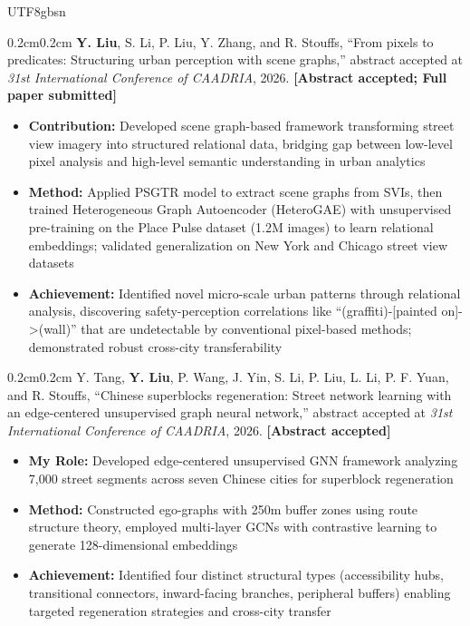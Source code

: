 \documentclass[10pt, letterpaper]{article}
\newenvironment{highlights}{
    \begin{itemize}[
        topsep=0.01cm, parsep=0.01cm, partopsep=0pt, itemsep=0pt,
        leftmargin=2.1em, labelwidth=2em, labelsep=0em,
        align=left
    ]
}{\end{itemize}}
\newenvironment{onecolentry}{\begin{adjustwidth}{0.2cm}{0.2cm}}{\end{adjustwidth}}
\begin{document}
\begin{CJK*}{UTF8}{gbsn}
\vspace{0.15cm}

\begin{onecolentry}
\textbf{Y. Liu}, S. Li, P. Liu, Y. Zhang, and R. Stouffs, ``From pixels to predicates: Structuring urban perception with scene graphs,'' abstract accepted at \textit{31st International Conference of CAADRIA}, 2026. \textbf{[Abstract accepted; Full paper submitted]}
  \begin{highlights}
    \item \textbf{Contribution:} Developed scene graph-based framework transforming street view imagery into structured relational data, bridging gap between low-level pixel analysis and high-level semantic understanding in urban analytics\\[-12pt]
    \item \textbf{Method:} Applied PSGTR model to extract scene graphs from SVIs, then trained Heterogeneous Graph Autoencoder (HeteroGAE) with unsupervised pre-training on the Place Pulse dataset (1.2M images) to learn relational embeddings; validated generalization on New York and Chicago street view datasets\\[-12pt]
    \item \textbf{Achievement:} Identified novel micro-scale urban patterns through relational analysis, discovering safety-perception correlations like ``(graffiti)-[painted on]->(wall)'' that are undetectable by conventional pixel-based methods; demonstrated robust cross-city transferability
  \end{highlights}
\end{onecolentry}

\vspace{0.15cm}

\begin{onecolentry}
Y. Tang, \textbf{Y. Liu}, P. Wang, J. Yin, S. Li, P. Liu, L. Li, P. F. Yuan, and R. Stouffs, ``Chinese superblocks regeneration: Street network learning with an edge-centered unsupervised graph neural network,'' abstract accepted at \textit{31st International Conference of CAADRIA}, 2026. \textbf{[Abstract accepted]}
  \begin{highlights}
    \item \textbf{My Role:} Developed edge-centered unsupervised GNN framework analyzing 7,000 street segments across seven Chinese cities for superblock regeneration\\[-12pt]
    \item \textbf{Method:} Constructed ego-graphs with 250m buffer zones using route structure theory, employed multi-layer GCNs with contrastive learning to generate 128-dimensional embeddings\\[-12pt]
    \item \textbf{Achievement:} Identified four distinct structural types (accessibility hubs, transitional connectors, inward-facing branches, peripheral buffers) enabling targeted regeneration strategies and cross-city transfer
  \end{highlights}
\end{onecolentry}


\end{CJK*}
\end{document}
